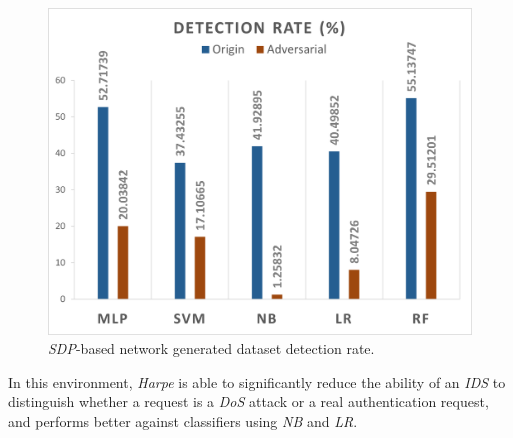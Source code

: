 \begin{figure}
    \centering
    \includegraphics[width=.95\columnwidth]{Figures/SDP-Dataset}
    \caption{\label{fig:dataset-sdp} \textit{SDP}-based network generated dataset detection rate.}
\end{figure}

In this environment, \textit{Harpe} is able to significantly reduce the ability of an \textit{IDS} to distinguish
whether a request is a \textit{DoS} attack or a real authentication request, and performs better against classifiers
using \textit{NB} and \textit{LR}.
